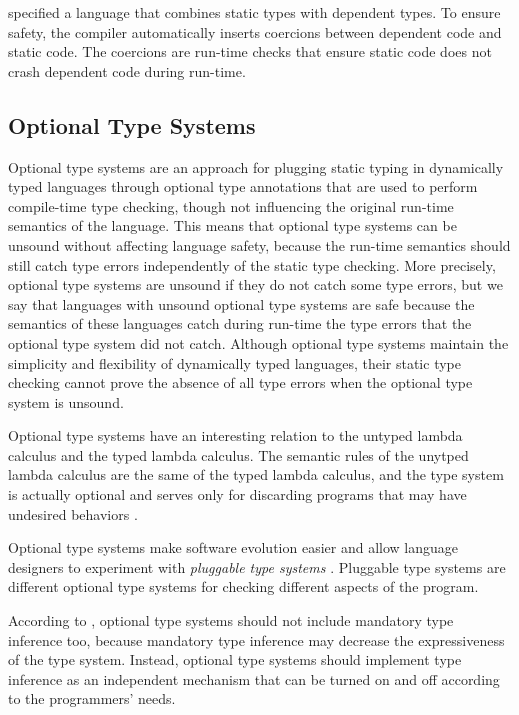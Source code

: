 \documentclass[preprint]{sig-alternate}
\begin{document}
\citet{ou2004dtd} specified a language that combines static types
with dependent types.
To ensure safety, the compiler automatically inserts coercions
between dependent code and static code.
The coercions are run-time checks that ensure static code does not
crash dependent code during run-time.

\subsection{Optional Type Systems}

Optional type systems \citep{bracha2004pluggable} are an approach for
plugging static typing in dynamically typed languages through
optional type annotations that are used to perform compile-time type
checking, though not influencing the original run-time semantics of
the language.
This means that optional type systems can be unsound without affecting
language safety, because the run-time semantics should still catch
type errors independently of the static type checking.
More precisely, optional type systems are unsound if they do not catch
some type errors, but we say that languages with unsound optional type
systems are safe because the semantics of these languages catch during
run-time the type errors that the optional type system did not catch.
Although optional type systems maintain the simplicity and
flexibility of dynamically typed languages, their static type
checking cannot prove the absence of all type errors when the optional
type system is unsound.

Optional type systems have an interesting relation to the untyped
lambda calculus and the typed lambda calculus.
The semantic rules of the unytped lambda calculus are the same of the
typed lambda calculus, and the type system is actually optional and
serves only for discarding programs that may have undesired behaviors
\citep{bracha2004pluggable}.

Optional type systems make software evolution easier and
allow language designers to experiment with
\textit{pluggable type systems} \citep{bracha2004pluggable}.
Pluggable type systems are different optional type systems for
checking different aspects of the program.

According to \citet{bracha2004pluggable}, optional type systems should
not include mandatory type inference too, because mandatory type
inference may decrease the expressiveness of the type system.
Instead, optional type systems should implement type inference as
an independent mechanism that can be turned on and off according to
the programmers' needs.
\end{document}
